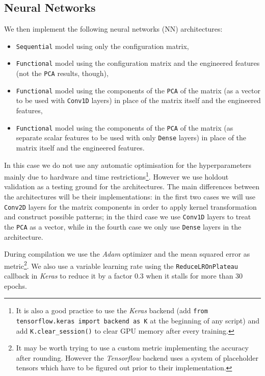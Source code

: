\subsection{Neural Networks}
    We then implement the following neural networks (NN) architectures:
    \begin{itemize}
        \item \texttt{Sequential} model using only the configuration matrix,
        \item \texttt{Functional} model using the configuration matrix and the engineered features (not the \texttt{PCA} results, though),
        \item \texttt{Functional} model using the components of the \texttt{PCA} of the matrix (as a vector to be used with \texttt{Conv1D} layers) in place of the matrix itself and the engineered features,
        \item \texttt{Functional} model using the components of the \texttt{PCA} of the matrix (as separate scalar features to be used with only \texttt{Dense} layers) in place of the matrix itself and the engineered features.
    \end{itemize}
    In this case we do not use any automatic optimisation for the hyperparameters mainly due to hardware and time restrictions\footnote{It is also a good practice to use the \textit{Keras} backend (add \texttt{from tensorflow.keras import backend as K} at the beginning of any script) and add \texttt{K.clear\_session()} to clear GPU memory after every training.}. However we use holdout validation as a testing ground for the architectures. The main differences between the architectures will be their implementations: in the first two cases we will use \texttt{Conv2D} layers for the matrix components in order to apply kernel transformation and construct possible patterns; in the third case we use \texttt{Conv1D} layers to treat the \texttt{PCA} as a vector, while in the fourth case we only use \texttt{Dense} layers in the architecture.
    
    During compilation we use the \textit{Adam} optimizer and the mean squared error as metric\footnote{It may be worth trying to use a custom metric implementing the accuracy after rounding. However the \textit{Tensorflow} backend uses a system of placeholder tensors which have to be figured out prior to their implementation.}. We also use a variable learning rate using the \texttt{ReduceLROnPlateau} callback in \textit{Keras} to reduce it by a factor 0.3 when it stalls for more than 30 epochs.
    
